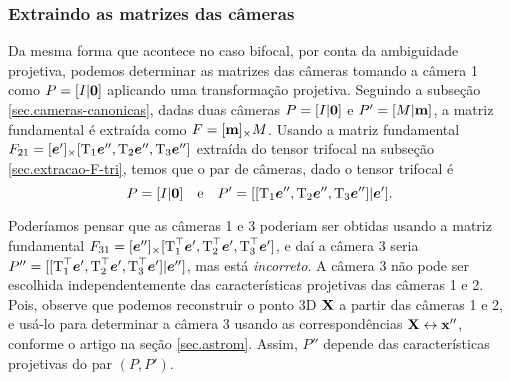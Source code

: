\subsubsection{Extraindo as matrizes das câmeras}

Da mesma forma que acontece no caso bifocal, por conta da ambiguidade projetiva, podemos determinar as matrizes das câmeras tomando a câmera 1 como $P=[I|{\bf 0}]$ aplicando uma transformação projetiva. Seguindo a subseção \ref{sec.cameras-canonicas}, dadas duas câmeras $P=[I|{\bf 0}]$ e $P'=[M|{\bf m}]$, a matriz fundamental é extraída como $F=[{\bf m}]_\times M$. Usando a matriz fundamental $F_{21}=[\boldsymbol{e}']_\times[\mbox{T}_1\boldsymbol{e}'',	\mbox{T}_2\boldsymbol{e}'',\mbox{T}_3\boldsymbol{e}'']$ extraída do tensor trifocal na subseção \ref{sec.extracao-F-tri}, temos que o par de câmeras, dado o tensor trifocal é
\begin{equation}\label{eq.deducao-simples-P-tri}
P=[I|{\bf 0}]\quad\text{e}\quad P'=[[\mbox{T}_1\boldsymbol{e}'',\mbox{T}_2\boldsymbol{e}'',\mbox{T}_3\boldsymbol{e}'']|\boldsymbol{e}'].
\end{equation}

Poderíamos pensar que as câmeras 1 e 3 poderiam ser obtidas usando a matriz fundamental $F_{31}=[\boldsymbol{e}'']_\times[\mbox{T}_1^\top\boldsymbol{e}',\mbox{T}_2^\top\boldsymbol{e}',\mbox{T}_3^\top\boldsymbol{e}']$, e daí a câmera 3 seria $P''=[[\mbox{T}_1^\top\boldsymbol{e}',\mbox{T}_2^\top\boldsymbol{e}',\mbox{T}_3^\top\boldsymbol{e}']|\boldsymbol{e}'']$, mas está {\it incorreto}. A câmera 3 não pode ser escolhida independentemente das características projetivas das câmeras 1 e 2. Pois, observe que podemos reconstruir o ponto 3D $\mathbf{X}$ a partir das câmeras 1 e 2, e usá-lo para determinar a câmera 3 usando as correspondências $\mathbf{X}\leftrightarrow\mathbf{x}''$, conforme o artigo na seção \ref{sec.astrom}. Assim, $P''$ depende das características projetivas do par $(P,P')$. 

